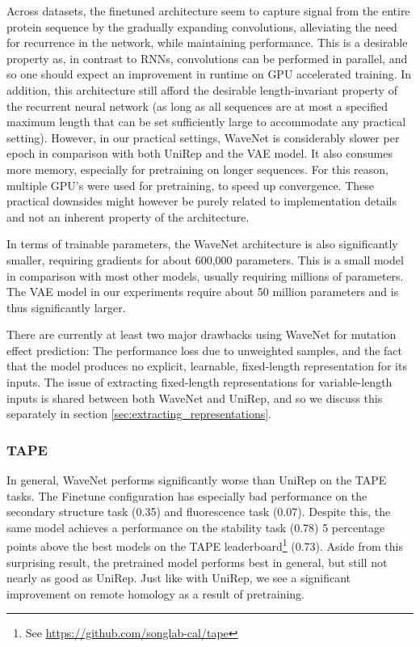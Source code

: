 Across datasets, the finetuned architecture seem to capture signal from the entire protein sequence by the gradually expanding convolutions, alleviating the need for recurrence in the network, while maintaining performance. This is a desirable property as, in contrast to RNNs, convolutions can be performed in parallel, and so one should expect an improvement in runtime on GPU accelerated training. In addition, this architecture still afford the desirable length-invariant property of the recurrent neural network (as long as all sequences are at most a specified maximum length that can be set sufficiently large to accommodate any practical setting). However, in our practical settings, WaveNet is considerably slower per epoch in comparison with both UniRep and the VAE model. It also consumes more memory, especially for pretraining on longer sequences. For this reason, multiple GPU's were used for pretraining, to speed up convergence. These practical downsides might however be purely related to implementation details and not an inherent property of the architecture.

In terms of trainable parameters, the WaveNet architecture is also significantly smaller, requiring gradients for about 600,000 parameters. This is a small model in comparison with most other models, usually requiring millions of parameters. The VAE model in our experiments require about 50 million parameters and is thus significantly larger. 

There are currently at least two major drawbacks using WaveNet for mutation effect prediction: The performance loss due to unweighted samples, and the fact that the model produces no explicit, learnable, fixed-length representation for its inputs. The issue of extracting fixed-length representations for variable-length inputs is shared between both WaveNet and UniRep, and so we discuss this separately in section \ref{sec:extracting_representations}.

\subsubsection{TAPE}
In general, WaveNet performs significantly worse than UniRep on the TAPE tasks. The Finetune configuration has especially bad performance on the secondary structure task (0.35) and fluorescence task (0.07). Despite this, the same model achieves a performance on the stability task (0.78) 5 percentage points above the best models on the TAPE leaderboard\footnote{See \url{https://github.com/songlab-cal/tape}} (0.73). Aside from this surprising result, the pretrained model performs best in general, but still not nearly as good as UniRep. Just like with UniRep, we see a significant improvement on remote homology as a result of pretraining.

